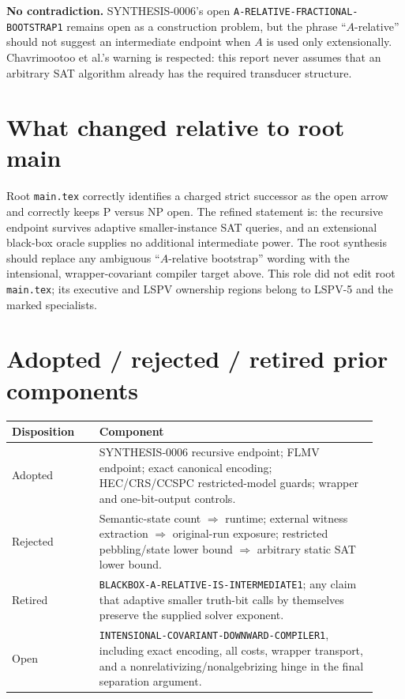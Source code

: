 \documentclass[11pt]{article}
\begin{document}
\textbf{No contradiction.}  SYNTHESIS-0006's open
\texttt{A-RELATIVE-FRACTIONAL-BOOTSTRAP1} remains open as a construction
problem, but the phrase ``$A$-relative'' should not suggest an intermediate
endpoint when $A$ is used only extensionally.  Chavrimootoo et al.'s warning is
respected: this report never assumes that an arbitrary SAT algorithm already
has the required transducer structure.

\section{What changed relative to root main}

Root \texttt{main.tex} correctly identifies a charged strict successor as the
open arrow and correctly keeps P versus NP open.  The refined statement is:
the recursive endpoint survives adaptive smaller-instance SAT queries, and an
extensional black-box oracle supplies no additional intermediate power.  The
root synthesis should replace any ambiguous ``$A$-relative bootstrap'' wording
with the intensional, wrapper-covariant compiler target above.  This role did
not edit root \texttt{main.tex}; its executive and LSPV ownership regions
belong to LSPV-5 and the marked specialists.

\section{Adopted / rejected / retired prior components}

\begin{tabular}{@{}p{0.22\linewidth}p{0.70\linewidth}@{}}
\toprule
Disposition & Component\\
\midrule
Adopted & SYNTHESIS-0006 recursive endpoint; FLMV endpoint; exact canonical
encoding; HEC/CRS/CCSPC restricted-model guards; wrapper and one-bit-output
controls.\\
Rejected & Semantic-state count $\Rightarrow$ runtime; external witness
extraction $\Rightarrow$ original-run exposure; restricted pebbling/state
lower bound $\Rightarrow$ arbitrary static SAT lower bound.\\
Retired & \texttt{BLACKBOX-A-RELATIVE-IS-INTERMEDIATE1}; any claim that adaptive
smaller truth-bit calls by themselves preserve the supplied solver exponent.\\
Open & \texttt{INTENSIONAL-COVARIANT-DOWNWARD-COMPILER1}, including exact
encoding, all costs, wrapper transport, and a nonrelativizing/nonalgebrizing
hinge in the final separation argument.\\
\bottomrule
\end{tabular}
\end{document}
